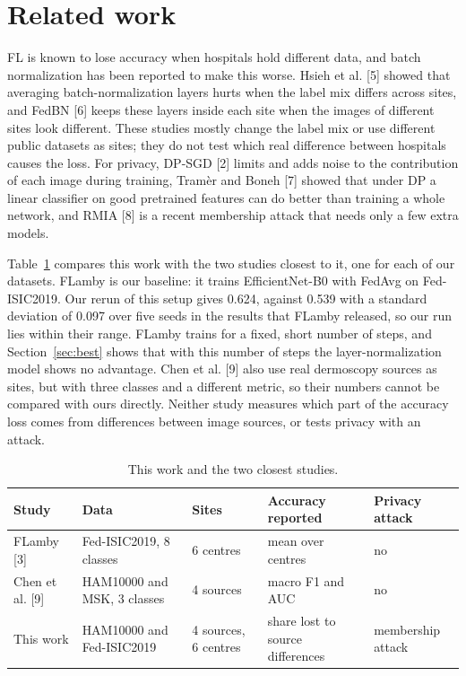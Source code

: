 \documentclass[10pt,twocolumn,a4paper]{article}
\begin{document}
\section{Related work}
FL is known to lose accuracy when hospitals hold different data, and batch normalization has been reported to make this worse. Hsieh et al. [5] showed that averaging batch-normalization layers hurts when the label mix differs across sites, and FedBN [6] keeps these layers inside each site when the images of different sites look different. These studies mostly change the label mix or use different public datasets as sites; they do not test which real difference between hospitals causes the loss. For privacy, DP-SGD [2] limits and adds noise to the contribution of each image during training, Tramèr and Boneh [7] showed that under DP a linear classifier on good pretrained features can do better than training a whole network, and RMIA [8] is a recent membership attack that needs only a few extra models.

Table~\ref{tab:cmp} compares this work with the two studies closest to it, one for each of our datasets. FLamby is our baseline: it trains EfficientNet-B0 with FedAvg on Fed-ISIC2019. Our rerun of this setup gives 0.624, against 0.539 with a standard deviation of 0.097 over five seeds in the results that FLamby released, so our run lies within their range. FLamby trains for a fixed, short number of steps, and Section~\ref{sec:best} shows that with this number of steps the layer-normalization model shows no advantage. Chen et al. [9] also use real dermoscopy sources as sites, but with three classes and a different metric, so their numbers cannot be compared with ours directly. Neither study measures which part of the accuracy loss comes from differences between image sources, or tests privacy with an attack.

\begin{table}[t]
\caption{This work and the two closest studies.}\label{tab:cmp}
\centering\small
\begin{tabular}{lllll}
\toprule
Study & Data & Sites & Accuracy reported & Privacy attack \\
\midrule
FLamby [3] & Fed-ISIC2019, 8 classes & 6 centres & mean over centres & no \\
Chen et al. [9] & HAM10000 and MSK, 3 classes & 4 sources & macro F1 and AUC & no \\
This work & HAM10000 and Fed-ISIC2019 & 4 sources, 6 centres & share lost to source differences & membership attack \\
\bottomrule
\end{tabular}
\end{table}
\end{document}
